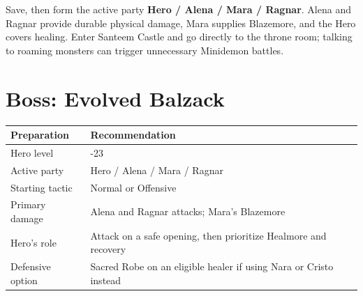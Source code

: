 \documentclass[
  american,
  10pt,
  letterpaper,
  oneside,
  open=any]{scrreprt}
\newcounter{none} %
\newenvironment{guidetable}{%
  \small\setstretch{1.0}%
  \setlength{\tabcolsep}{4pt}%
  \setlength{\LTpre}{8pt}\setlength{\LTpost}{10pt}%
  \renewcommand{\arraystretch}{1.16}%
}{ }
\begin{document}
Save, then form the active party \textbf{Hero / Alena / Mara / Ragnar}.
Alena and Ragnar provide durable physical damage, Mara supplies
Blazemore, and the Hero covers healing. Enter Santeem Castle and go
directly to the throne room; talking to roaming monsters can trigger
unnecessary Minidemon battles.

\section{Boss: Evolved Balzack}\label{boss-evolved-balzack}

\begin{guidetable}

{\def\LTcaptype{none} %
\begin{longtable}[]{@{}
  >{\raggedright\arraybackslash}p{}
  >{\raggedright\arraybackslash}p{}@{}}
\toprule\noalign{}
\begin{minipage}[b]{\linewidth}\raggedright
\color{GuideGreen}\bfseries Preparation
\end{minipage} & \begin{minipage}[b]{\linewidth}\raggedright
\color{GuideGreen}\bfseries Recommendation
\end{minipage} \\
\midrule\noalign{}
\endhead
\bottomrule\noalign{}
\endlastfoot
Hero level & 22-23 \\
Active party & Hero / Alena / Mara / Ragnar \\
Starting tactic & Normal or Offensive \\
Primary damage & Alena and Ragnar attacks; Mara's Blazemore \\
Hero's role & Attack on a safe opening, then prioritize Healmore and
recovery \\
Defensive option & Sacred Robe on an eligible healer if using Nara or
Cristo instead \\
\end{longtable}
}

\end{guidetable}
\end{document}
